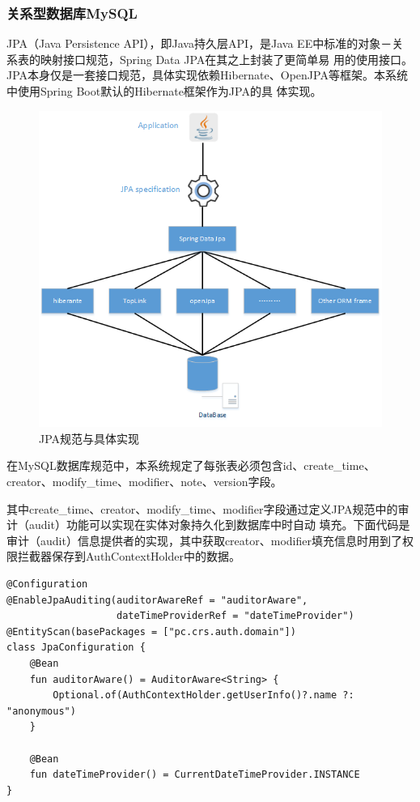 \documentclass[titlepage,UTF8,linespread=1.5]{ctexart}
\begin{document}
\subsubsection{关系型数据库MySQL}
JPA（Java Persistence API），即Java持久层API，是Java EE中标准的对象－关系表的映射接口规范，Spring Data JPA在其之上封装了更简单易
用的使用接口。JPA本身仅是一套接口规范，具体实现依赖Hibernate、OpenJPA等框架。本系统中使用Spring Boot默认的Hibernate框架作为JPA的具
体实现。\par
\begin{figure}[H]
    \centering
    \includegraphics[width=130mm]{struct-jpa.png}
    \caption{JPA规范与具体实现}
    \label{fig:struct-jpa}
\end{figure}
在MySQL数据库规范中，本系统规定了每张表必须包含id、create\_time、creator、modify\_time、modifier、note、version字段。\par
其中create\_time、creator、modify\_time、modifier字段通过定义JPA规范中的审计（audit）功能可以实现在实体对象持久化到数据库中时自动
填充。下面代码是审计（audit）信息提供者的实现，其中获取creator、modifier填充信息时用到了权限拦截器保存到AuthContextHolder中的数据。\par
\begin{mdframed}\begin{verbatim}
@Configuration
@EnableJpaAuditing(auditorAwareRef = "auditorAware", 
                   dateTimeProviderRef = "dateTimeProvider")
@EntityScan(basePackages = ["pc.crs.auth.domain"])
class JpaConfiguration {
    @Bean
    fun auditorAware() = AuditorAware<String> { 
        Optional.of(AuthContextHolder.getUserInfo()?.name ?: "anonymous") 
    }

    @Bean
    fun dateTimeProvider() = CurrentDateTimeProvider.INSTANCE
}
\end{verbatim}\end{mdframed}\par
\end{document}
